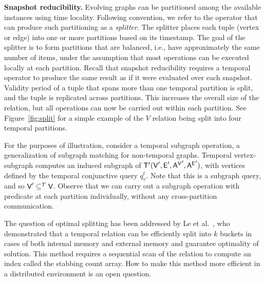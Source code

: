 {\bf Snapshot reducibility.}  Evolving graphs can be partitioned among
the available instances using time locality.  Following convention, we
refer to the operator that can produce such partitioning as a {\em
  splitter}.  The splitter places each tuple (vertex or edge) into one
or more partitions based on its timestamp.  The goal of the splitter
is to form partitions that are balanced, i.e., have approximately the
same number of items, under the assumption that most operations can be
executed locally at each partition.  Recall that snapshot reducibility
requires a temporal operator to produce the same result as if it were
evaluated over each snapshot.  Validity period of a tuple that spans
more than one temporal partition is split, and the tuple is replicated
across partitions.  This increases the overall size of the relation,
but all operations can now be carried out within each partition.  See
Figure~\ref{fig:split} for a simple example of the $V$ relation being
split into four temporal partitions.  

For the purposes of illustration, consider a temporal subgraph
operation, a generalization of subgraph matching for non-temporal
graphs.  Temporal vertex-subgraph  computes an
induced subgraph of \tve $\mathsf{T}'(\textsf{V}', \textsf{E}', \mathsf{A^{V}}', \mathsf{A^{E}}')$, with
vertices defined by the temporal conjunctive query $q^t_v$.  Note that
this is a subgraph query, and so $\textsf{V}' \subseteq^T \textsf{V}$.  Observe that
we can carry out a subgraph operation with predicate
 at each partition individually, without any
cross-partition communication.

The question of optimal splitting has been addressed by Le et
al.~\cite{Le2013}, who demonstrated that a temporal relation can be
efficiently split into $k$ buckets in cases of both internal memory
and external memory and guarantee optimality of solution.  This method requires a sequential scan of the relation to
compute an index called the stabbing count array.  How to make this
method more efficient in a distributed environment is an open
question.


